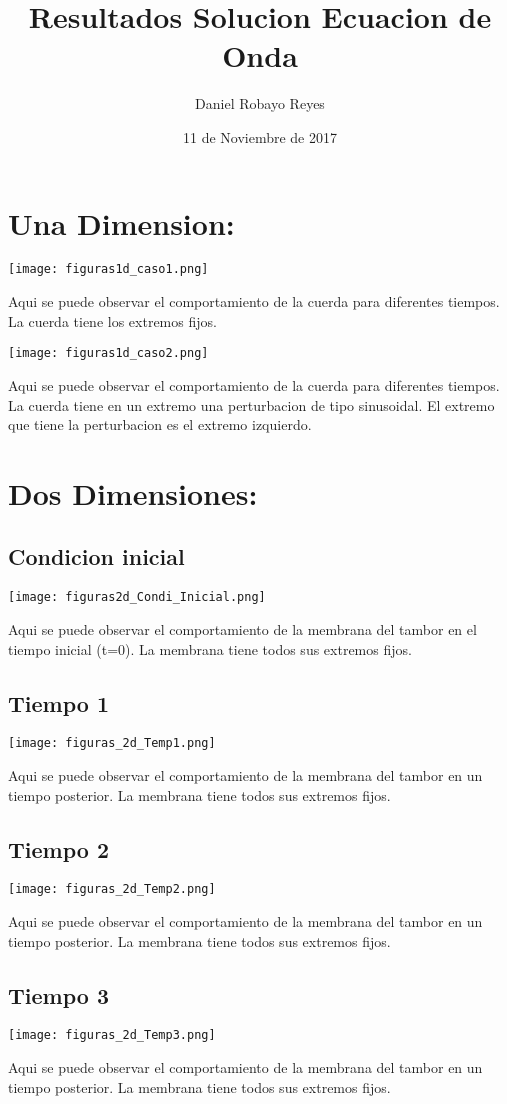 \documentclass[12pt]{article}
\author{Daniel Robayo Reyes}
\date{11 de Noviembre de 2017}
\title{Resultados Solucion Ecuacion de Onda}
\begin{document}
\maketitle
\section{Una Dimension:}


\texttt{[image: figuras1d\_caso1.png]}

Aqui se puede observar el comportamiento de la cuerda para diferentes tiempos. La cuerda tiene los extremos fijos.

\texttt{[image: figuras1d\_caso2.png]}

Aqui se puede observar el comportamiento de la cuerda para diferentes tiempos. La cuerda tiene en un extremo una perturbacion de tipo sinusoidal. El extremo que tiene la perturbacion es el extremo izquierdo.

\section{Dos Dimensiones:}

\subsection{Condicion inicial}

\texttt{[image: figuras2d\_Condi\_Inicial.png]}

Aqui se puede observar el comportamiento de la membrana del tambor en el tiempo inicial (t=0). La membrana tiene todos sus extremos fijos.

\subsection{Tiempo 1}
\texttt{[image: figuras\_2d\_Temp1.png]}

Aqui se puede observar el comportamiento de la membrana del tambor en un tiempo posterior. La membrana tiene todos sus extremos fijos.

\subsection{Tiempo 2}
\texttt{[image: figuras\_2d\_Temp2.png]}

Aqui se puede observar el comportamiento de la membrana del tambor en un tiempo posterior. La membrana tiene todos sus extremos fijos.


\subsection{Tiempo 3}
\texttt{[image: figuras\_2d\_Temp3.png]}

Aqui se puede observar el comportamiento de la membrana del tambor en un tiempo posterior. La membrana tiene todos sus extremos fijos.
\end{document}
